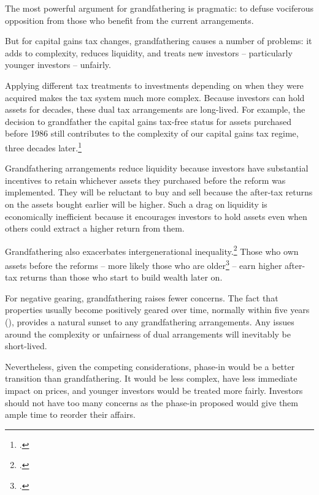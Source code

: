 The most powerful argument for grandfathering is pragmatic: to defuse vociferous opposition from those who benefit from the current arrangements.

But for capital gains tax changes, grandfathering causes a number of problems: it adds to complexity, reduces liquidity, and treats new investors – particularly younger investors – unfairly.

Applying different tax treatments to investments depending on when they were acquired makes the tax system much more complex. Because investors can hold assets for decades, these dual tax arrangements are long-lived.  For example, the decision to grandfather the capital gains tax-free status for assets purchased before 1986 still contributes to the complexity of our capital gains tax regime, three decades later.\footcite[][75]{HenryTaxReview2010} 

Grandfathering arrangements reduce liquidity because investors have substantial incentives to retain whichever assets they purchased before the reform was implemented. They will be reluctant to buy and sell because the after-tax returns on the assets bought earlier will be higher. Such a drag on liquidity is economically inefficient because it encourages investors to hold assets even when others could extract a higher return from them. 

Grandfathering also exacerbates intergenerational inequality.\footcite{DaleyWoodWeidmannEtAl2014}  Those who own assets before the reforms – more likely those who are older\footcite[][14]{DaleyWoodWeidmannEtAl2014}  – earn higher after-tax returns than those who start to build wealth later on. 

For negative gearing, grandfathering raises fewer concerns. The fact that properties usually become positively geared over time, normally within five years (), provides a natural sunset to any grandfathering arrangements. Any issues around the complexity or unfairness of dual arrangements will inevitably be short-lived. 

Nevertheless, given the competing considerations, phase-in would be a better transition than grandfathering. It would be less complex, have less immediate impact on prices, and younger investors would be treated more fairly. Investors should not have too many concerns as the phase-in proposed would give them ample time to reorder their affairs.
















